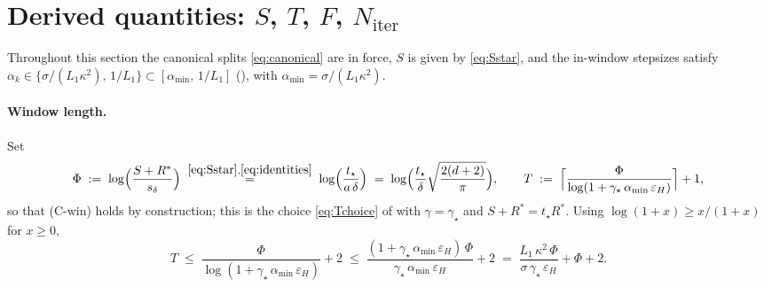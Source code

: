\documentclass[11pt,a4paper]{article}
\theoremstyle{plain}
\theoremstyle{definition}
\newcommand{\eps}{\varepsilon}
\newcommand{\epsH}{\eps_{H}}
\newcommand{\sdel}{s_{\delta}}
\newcommand{\Rstar}{R^{*}}
\newcommand{\Niter}{N_{\mathrm{iter}}}
\newcommand{\tstar}{t_\star}
\newcommand{\amin}{\alpha_{\min}}
\begin{document}
\section{Derived quantities: $S$, $T$, $F$, $\Niter$}\label{sec:derived}

Throughout this section the canonical splits \eqref{eq:canonical} are in
force, $S$ is given by \eqref{eq:Sstar}, and the in-window stepsizes satisfy
$\alpha_k \in \{\sigma/(L_1\kappa^2),\, 1/L_1\} \subset [\amin,\, 1/L_1]$
(), with $\amin = \sigma/(L_1\kappa^2)$.

\paragraph{Window length.} Set
\begin{equation}\label{eq:Phi}
\Phi \;:=\; \log\!\Big(\frac{S+\Rstar}{\sdel}\Big)
\;\overset{\eqref{eq:Sstar},\eqref{eq:identities}}{=}\;
\log\!\Big(\frac{\tstar}{a\,\delta}\Big)
\;=\; \log\!\Big(\frac{\tstar}{\delta}\sqrt{\frac{2(d+2)}{\pi}}\Big),
\qquad
T \;:=\; \Big\lceil \frac{\Phi}{\log(1+\gamma_\star\,\amin\,\epsH)}
\Big\rceil + 1,
\end{equation}
so that (C-win) holds by construction; this is the choice
\eqref{eq:Tchoice} of  with $\gamma = \gamma_\star$
and $S+\Rstar = \tstar\Rstar$. Using $\log(1+x)\ge x/(1+x)$ for $x \ge 0$,
\begin{equation}\label{eq:T}
T \;\le\; \frac{\Phi}{\log(1+\gamma_\star\,\amin\,\epsH)} + 2
\;\le\; \frac{(1+\gamma_\star\,\amin\,\epsH)\,\Phi}{\gamma_\star\,\amin\,\epsH} + 2
\;=\; \frac{L_1\,\kappa^2\,\Phi}{\sigma\,\gamma_\star\,\epsH} + \Phi + 2 .
\tag{T}
\end{equation}
\end{document}
